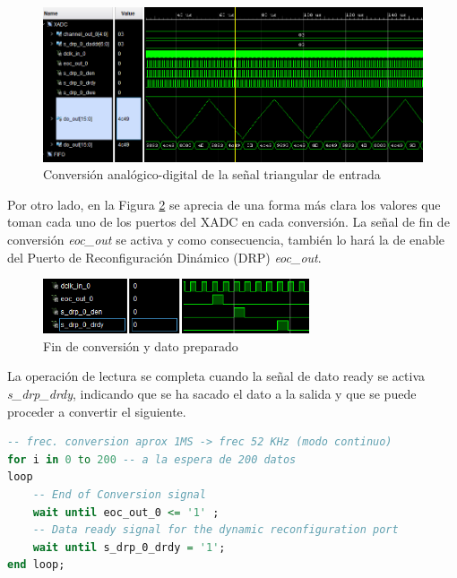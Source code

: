 \vspace{3mm}

\begin{figure}[h]
    \centering
    \includegraphics[width=1\textwidth]{img/simu/xadc.PNG}
    \caption{Conversión analógico-digital de la señal triangular de entrada}
    \label{fig:xadc}
\end{figure}

\vspace{3mm}
\pagebreak

Por otro lado, en la Figura \ref{fig:xadc2} se aprecia de una forma más clara los valores que toman cada uno de los puertos del XADC en cada conversión. La señal de fin de conversión \textit{eoc\_out} se activa y como consecuencia, también lo hará la de enable del Puerto de Reconfiguración Dinámico (DRP) \textit{eoc\_out}. 

\vspace{3mm}

\begin{figure}[h]
    \centering
    \includegraphics[width=0.7\textwidth]{img/simu/xadc2.PNG}
    \caption{Fin de conversión y dato preparado}
    \label{fig:xadc2}
\end{figure}

\vspace{3mm}

La operación de lectura se completa cuando la señal de dato ready se activa \textit{s\_drp\_drdy}, indicando que se ha sacado el dato a la salida y que se puede proceder a convertir el siguiente.

\vspace{3mm}

\begin{lstlisting}[language=VHDL, style=mystyle, caption={Bucle de conversión de los 200 datos}]
-- frec. conversion aprox 1MS -> frec 52 KHz (modo continuo)
for i in 0 to 200 -- a la espera de 200 datos 
loop     
    -- End of Conversion signal 
    wait until eoc_out_0 <= '1' ; 
    -- Data ready signal for the dynamic reconfiguration port  
    wait until s_drp_0_drdy = '1'; 
end loop;
\end{lstlisting}

